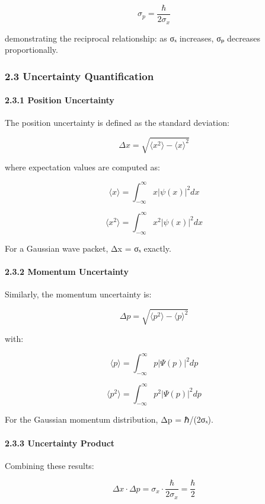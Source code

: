 \documentclass[
  11pt,
]{article}
\begin{document}
\[\sigma_p = \frac{\hbar}{2\sigma_x}\]

demonstrating the reciprocal relationship: as σₓ increases, σₚ decreases
proportionally.

\subsubsection{2.3 Uncertainty
Quantification}\label{uncertainty-quantification}

\paragraph{2.3.1 Position Uncertainty}\label{position-uncertainty}

The position uncertainty is defined as the standard deviation:

\[\Delta x = \sqrt{\langle x^2 \rangle - \langle x \rangle^2}\]

where expectation values are computed as:

\[\langle x \rangle = \int_{-\infty}^{\infty} x|\psi(x)|^2 dx\]

\[\langle x^2 \rangle = \int_{-\infty}^{\infty} x^2|\psi(x)|^2 dx\]

For a Gaussian wave packet, Δx = σₓ exactly.

\paragraph{2.3.2 Momentum Uncertainty}\label{momentum-uncertainty}

Similarly, the momentum uncertainty is:

\[\Delta p = \sqrt{\langle p^2 \rangle - \langle p \rangle^2}\]

with:

\[\langle p \rangle = \int_{-\infty}^{\infty} p|\Psi(p)|^2 dp\]

\[\langle p^2 \rangle = \int_{-\infty}^{\infty} p^2|\Psi(p)|^2 dp\]

For the Gaussian momentum distribution, Δp = ℏ/(2σₓ).

\paragraph{2.3.3 Uncertainty Product}\label{uncertainty-product}

Combining these results:

\[\Delta x \cdot \Delta p = \sigma_x \cdot \frac{\hbar}{2\sigma_x} = \frac{\hbar}{2}\]
\end{document}
